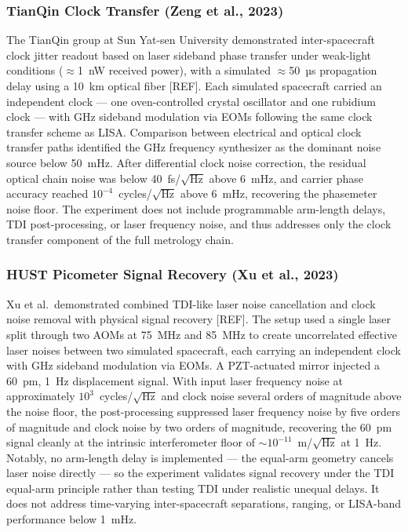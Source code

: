 \subsubsection{TianQin Clock Transfer (Zeng et al., 2023)}
The TianQin group at Sun Yat-sen University demonstrated inter-spacecraft clock jitter readout based on laser sideband phase transfer under weak-light conditions ($\approx$1~nW received power), with a simulated $\approx$50~µs propagation delay using a 10~km optical fiber [REF]. Each simulated spacecraft carried an independent clock — one oven-controlled crystal oscillator and one rubidium clock — with GHz sideband modulation via EOMs following the same clock transfer scheme as LISA. Comparison between electrical and optical clock transfer paths identified the GHz frequency synthesizer as the dominant noise source below 50~mHz. After differential clock noise correction, the residual optical chain noise was below 40~fs/$\sqrt{\text{Hz}}$ above 6~mHz, and carrier phase accuracy reached $10^{-4}$~cycles/$\sqrt{\text{Hz}}$ above 6~mHz, recovering the phasemeter noise floor. The experiment does not include programmable arm-length delays, TDI post-processing, or laser frequency noise, and thus addresses only the clock transfer component of the full metrology chain.

\subsubsection{HUST Picometer Signal Recovery (Xu et al., 2023)}
Xu et al.\ demonstrated combined TDI-like laser noise cancellation and clock noise removal with physical signal recovery [REF]. The setup used a single laser split through two AOMs at 75~MHz and 85~MHz to create uncorrelated effective laser noises between two simulated spacecraft, each carrying an independent clock with GHz sideband modulation via EOMs. A PZT-actuated mirror injected a 60~pm, 1~Hz displacement signal. With input laser frequency noise at approximately $10^{3}$~cycles/$\sqrt{\text{Hz}}$ and clock noise several orders of magnitude above the noise floor, the post-processing suppressed laser frequency noise by five orders of magnitude and clock noise by two orders of magnitude, recovering the 60~pm signal cleanly at the intrinsic interferometer floor of $\sim$$10^{-11}$~m/$\sqrt{\text{Hz}}$ at 1~Hz. Notably, no arm-length delay is implemented — the equal-arm geometry cancels laser noise directly — so the experiment validates signal recovery under the TDI equal-arm principle rather than testing TDI under realistic unequal delays. It does not address time-varying inter-spacecraft separations, ranging, or LISA-band performance below 1~mHz.